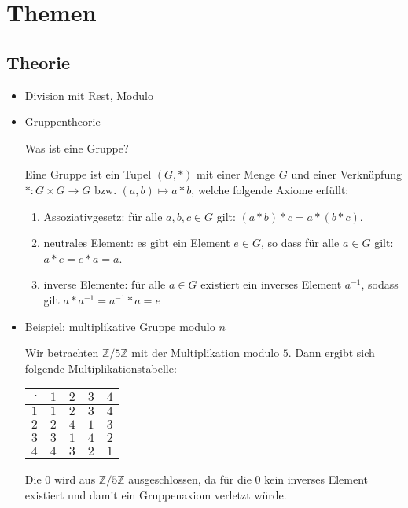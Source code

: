 \documentclass[
  a4paper,
  11pt,
]{article}
\title{}
\author{}
\newcommand{\Z}{\mathbb{Z}}
\begin{document}
\section*{Themen}
\label{sec:Themen}

\subsection*{Theorie}
\label{sub:Theorie}

\begin{itemize}
  \item Division mit Rest, Modulo

  \item Gruppentheorie

    Was ist eine Gruppe?

      Eine Gruppe ist ein Tupel $(G, *)$ mit einer Menge $G$ und einer
      Verknüpfung $*: G \times G \to G$ bzw. $(a, b) \mapsto a * b$, welche
      folgende Axiome erfüllt:
      \begin{enumerate}
        \item Assoziativgesetz: für alle $a,b,c \in G$ gilt: $(a * b) * c = a
          * (b * c)$.
        \item neutrales Element: es gibt ein Element $e \in G$, so dass für
          alle $a \in G$ gilt: $a * e = e * a = a$.
        \item inverse Elemente: für alle $a \in G$ existiert ein inverses
          Element $a^{-1}$, sodass gilt $a * a^{-1} = a^{-1} * a = e$
      \end{enumerate}

  \item Beispiel: multiplikative Gruppe modulo $n$

    Wir betrachten $\Z/5\Z$ mit der Multiplikation modulo $5$. Dann ergibt sich
    folgende Multiplikationstabelle:
    \begin{center}
      \begin{tabular}{r|cccc}
        $\cdot$ & $1$ & $2$ & $3$ & $4$\\\hline
          $1$   & $1$ & $2$ & $3$ & $4$\\
          $2$   & $2$ & $4$ & $1$ & $3$\\
          $3$   & $3$ & $1$ & $4$ & $2$\\
          $4$   & $4$ & $3$ & $2$ & $1$
      \end{tabular}
    \end{center}
    Die $0$ wird aus $\Z/5\Z$ ausgeschlossen, da für die $0$ kein inverses
    Element existiert und damit ein Gruppenaxiom verletzt würde.


\end{itemize}
\end{document}
